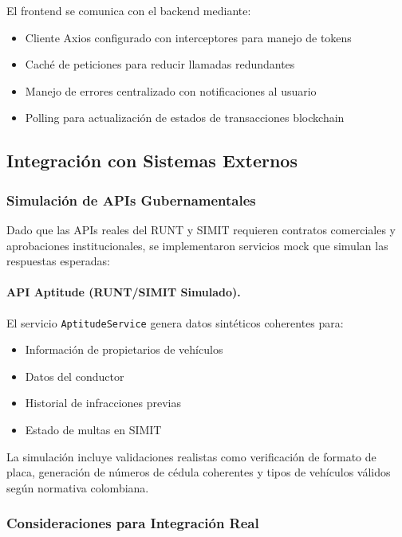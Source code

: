 El frontend se comunica con el backend mediante:
\begin{itemize}
    \item Cliente Axios configurado con interceptores para manejo de tokens
    \item Caché de peticiones para reducir llamadas redundantes
    \item Manejo de errores centralizado con notificaciones al usuario
    \item Polling para actualización de estados de transacciones blockchain
\end{itemize}

\subsection{Integración con Sistemas Externos}

\subsubsection{Simulación de APIs Gubernamentales}

Dado que las APIs reales del RUNT y SIMIT requieren contratos comerciales y aprobaciones institucionales, se implementaron servicios mock que simulan las respuestas esperadas:

\paragraph{API Aptitude (RUNT/SIMIT Simulado).}
El servicio \texttt{AptitudeService} genera datos sintéticos coherentes para:
\begin{itemize}
    \item Información de propietarios de vehículos
    \item Datos del conductor
    \item Historial de infracciones previas
    \item Estado de multas en SIMIT
\end{itemize}

La simulación incluye validaciones realistas como verificación de formato de placa, generación de números de cédula coherentes y tipos de vehículos válidos según normativa colombiana.

\subsubsection{Consideraciones para Integración Real}

